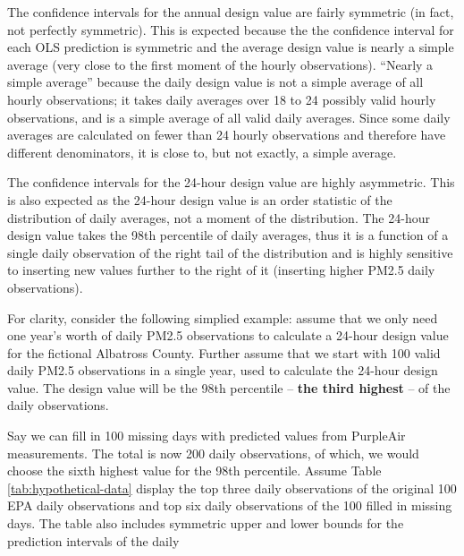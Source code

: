 \documentclass[12pt]{article}
\begin{document}
The confidence intervals for the annual design value are fairly symmetric (in fact, not perfectly symmetric). This is expected because the the confidence interval for each OLS prediction is symmetric and the average design value is nearly a simple average (very close to the first moment of the hourly observations). ``Nearly a simple average'' because the daily design value is not a simple average of all hourly observations; it takes daily averages over 18 to 24 possibly valid hourly observations, and is a simple average of all valid daily averages. Since some daily averages are calculated on fewer than 24 hourly observations and therefore have different denominators, it is close to, but not exactly, a simple average.

The confidence intervals for the 24-hour design value are highly asymmetric. This is also expected as the 24-hour design value is an order statistic of the distribution of daily averages, not a moment of the distribution. The 24-hour design value takes the 98th percentile of daily averages, thus it is a function of a single daily observation of the right tail of the distribution and is highly sensitive to inserting new values further to the right of it (inserting higher PM2.5 daily observations).

For clarity, consider the following simplied example: assume that we only need one year's worth of daily PM2.5 observations to calculate a 24-hour design value for the fictional Albatross County. Further assume that we start with 100 valid daily PM2.5 observations in a single year, used to calculate the 24-hour design value. The design value will be the 98th percentile -- \textbf{the third highest} -- of the daily observations. 

Say we can fill in 100 missing days with predicted values from PurpleAir measurements. The total is now 200 daily observations, of which, we would choose the sixth highest value for the 98th percentile. Assume Table \ref{tab:hypothetical-data} display the top three daily observations of the original 100 EPA daily observations and top six daily observations of the 100 filled in missing days. The table also includes symmetric upper and lower bounds for the prediction intervals of the daily 
\end{document}
